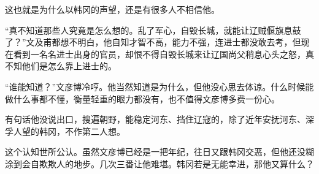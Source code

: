 这也就是为什么以韩冈的声望，还是有很多人不相信他。

“真不知道那些人究竟是怎么想的。乱了军心，自毁长城，就能让辽贼偃旗息鼓了？”文及甫都想不明白，他自知才智不高，能力不强，连进士都没敢去考，但现在看到一名名进士出身的官员，却恨不得自毁长城来让辽国尚父稍息心头之怒，真不知他们是怎么靠上进士的。

“谁能知道？”文彦博冷哼。他当然知道是为什么，但他没心思去体谅。什么时候能做什么事都不懂，衡量轻重的眼力都没有，也不值得文彦博多费一份心。

有句话他没说出口，搜遍朝野，能稳定河东、挡住辽寇的，除了近年安抚河东、深孚人望的韩冈，不作第二人想。

这个认知世所公认。虽然文彦博已经是一把年纪，往日又跟韩冈交恶，但他还没糊涂到会自欺欺人的地步。几次三番让他难堪。韩冈若是无能幸进，那他又算什么？
